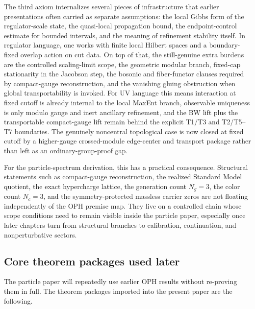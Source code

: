 \documentclass[11pt]{article}
\begin{document}
The third axiom internalizes several pieces of infrastructure that earlier presentations often
carried as separate assumptions: the local Gibbs form of the regulator-scale state, the
quasi-local propagation bound, the endpoint-control estimate for bounded intervals, and the
meaning of refinement stability itself. In regulator language, one works with finite local
Hilbert spaces and a boundary-fixed overlap action on cut data. On top of that, the still-genuine extra burdens are the controlled scaling-limit
scope, the geometric modular branch, fixed-cap stationarity in the Jacobson step, the bosonic
and fiber-functor clauses required by compact-gauge reconstruction, and the vanishing gluing
obstruction when global transportability is invoked.
For UV language this means interaction at fixed cutoff is already internal to the local MaxEnt
branch, observable uniqueness is only modulo gauge and inert ancillary refinement, and the BW
lift plus the transportable compact-gauge lift remain behind the explicit T1/T3 and
T2/T5--T7 boundaries. The genuinely noncentral topological case is now closed at fixed cutoff
by a higher-gauge crossed-module edge-center and transport package rather than left as an
ordinary-group-proof gap.

For the particle-spectrum derivation, this has a practical consequence. Structural statements such
as compact-gauge reconstruction, the realized Standard Model quotient, the exact hypercharge
lattice, the generation count \(N_g=3\), the color count \(N_c=3\), and the symmetry-protected
massless carrier zeros are not floating independently of the OPH premise map. They live on a
controlled chain whose scope conditions need to remain visible inside the particle paper,
especially once later chapters turn from structural branches to calibration, continuation, and
nonperturbative sectors.

\subsection{Core theorem packages used later}

The particle paper will repeatedly use earlier OPH results without re-proving them in full. The
theorem packages imported into the present paper are the following.
\end{document}
